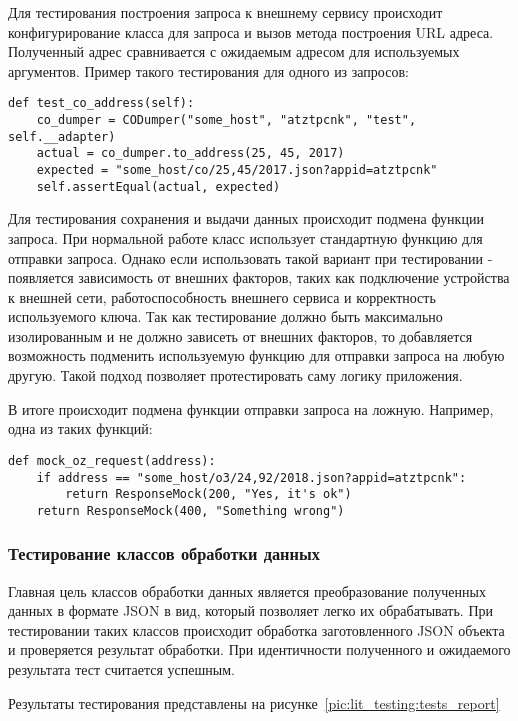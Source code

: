 Для тестирования построения запроса к внешнему сервису происходит конфигурирование класса для запроса и вызов метода построения URL адреса.
Полученный адрес сравнивается с ожидаемым адресом для используемых аргументов.
Пример такого тестирования для одного из запросов:

\begin{lstlisting}
def test_co_address(self):
    co_dumper = CODumper("some_host", "atztpcnk", "test", self.__adapter)
    actual = co_dumper.to_address(25, 45, 2017)
    expected = "some_host/co/25,45/2017.json?appid=atztpcnk"
    self.assertEqual(actual, expected)
\end{lstlisting}

Для тестирования сохранения и выдачи данных происходит подмена функции запроса.
При нормальной работе класс использует стандартную функцию для отправки запроса.
Однако если использовать такой вариант при тестировании - появляется зависимость от внешних факторов, таких как подключение устройства к внешней сети, работоспособность внешнего сервиса и корректность используемого ключа.
Так как тестирование должно быть максимально изолированным и не должно зависеть от внешних факторов, то добавляется возможность подменить используемую функцию для отправки запроса на любую другую.
Такой подход позволяет протестировать саму логику приложения.

В итоге происходит подмена функции отправки запроса на ложную.
Например, одна из таких функций:
\begin{lstlisting}
def mock_oz_request(address):
    if address == "some_host/o3/24,92/2018.json?appid=atztpcnk":
        return ResponseMock(200, "Yes, it's ok")
    return ResponseMock(400, "Something wrong")
\end{lstlisting}

\subsubsection{Тестирование классов обработки данных}

Главная цель классов обработки данных является преобразование полученных данных в формате JSON в вид, который позволяет легко их обрабатывать.
При тестировании таких классов происходит обработка заготовленного JSON объекта и проверяется результат обработки.
При идентичности полученного и ожидаемого результата тест считается успешным.

Результаты тестирования представлены на рисунке~\ref{pic:lit_testing:tests_report}

